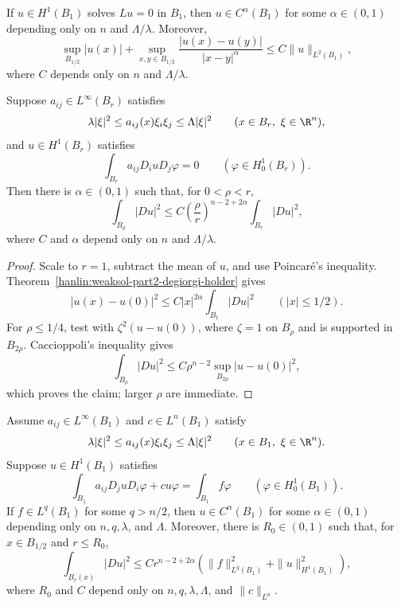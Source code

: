 \begin{theorem}\label{hanlin:weaksol-part2-degiorgi-holder}
If $u\in H^1(B_1)$ solves $Lu=0$ in $B_1$, then
$u\in C^\alpha(B_1)$ for some $\alpha\in(0,1)$ depending only on $n$ and
$\Lambda/\lambda$. Moreover,
\[
\sup_{B_{1/2}}|u(x)|+
\sup_{x,y\in B_{1/2}}\frac{|u(x)-u(y)|}{|x-y|^\alpha}
\leq C\|u\|_{L^2(B_1)},
\]
where $C$ depends only on $n$ and $\Lambda/\lambda$.
\end{theorem}

\begin{lemma}\label{hanlin:weaksol-part2-energy-decay}
Suppose $a_{ij}\in L^\infty(B_r)$ satisfies
\[
\lambda|\xi|^2\leq a_{ij}(x)\xi_i\xi_j\leq\Lambda|\xi|^2
\qquad(x\in B_r,\ \xi\in\R^n),
\]
and $u\in H^1(B_r)$ satisfies
\[
\int_{B_r}a_{ij}D_i uD_j\varphi=0
\qquad(\varphi\in H^1_0(B_r)).
\]
Then there is $\alpha\in(0,1)$ such that, for $0<\rho<r$,
\[
\int_{B_\rho}|Du|^2
\leq C\left(\frac\rho r\right)^{n-2+2\alpha}
\int_{B_r}|Du|^2,
\]
where $C$ and $\alpha$ depend only on $n$ and $\Lambda/\lambda$.
\end{lemma}
\begin{proof}
\sketch Scale to $r=1$, subtract the mean of $u$, and use Poincar\'e's
inequality. Theorem~\ref{hanlin:weaksol-part2-degiorgi-holder} gives
\[
|u(x)-u(0)|^2\leq C|x|^{2\alpha}\int_{B_1}|Du|^2
\qquad(|x|\leq1/2).
\]
For $\rho\leq1/4$, test with
$\zeta^2(u-u(0))$, where $\zeta=1$ on $B_\rho$ and is supported in
$B_{2\rho}$. Caccioppoli's inequality gives
\[
\int_{B_\rho}|Du|^2
\leq C\rho^{n-2}\sup_{B_{2\rho}}|u-u(0)|^2,
\]
which proves the claim; larger $\rho$ are immediate.
\end{proof}

\begin{theorem}\label{hanlin:weaksol-part2-general-linear-holder}
Assume $a_{ij}\in L^\infty(B_1)$ and $c\in L^n(B_1)$ satisfy
\[
\lambda|\xi|^2\leq a_{ij}(x)\xi_i\xi_j\leq\Lambda|\xi|^2
\qquad(x\in B_1,\ \xi\in\R^n).
\]
Suppose $u\in H^1(B_1)$ satisfies
\[
\int_{B_1}a_{ij}D_j uD_i\varphi+cu\varphi
=\int_{B_1}f\varphi
\qquad(\varphi\in H^1_0(B_1)).
\]
If $f\in L^q(B_1)$ for some $q>n/2$, then
$u\in C^\alpha(B_1)$ for some $\alpha\in(0,1)$ depending only on
$n,q,\lambda$, and $\Lambda$. Moreover, there is $R_0\in(0,1)$ such
that, for $x\in B_{1/2}$ and $r\leq R_0$,
\[
\int_{B_r(x)}|Du|^2
\leq Cr^{n-2+2\alpha}
\left(\|f\|_{L^q(B_1)}^2+\|u\|_{H^1(B_1)}^2\right),
\]
where $R_0$ and $C$ depend only on
$n,q,\lambda,\Lambda$, and $\|c\|_{L^n}$.
\end{theorem}

